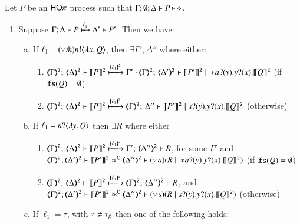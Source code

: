 	Let $P$ be an  $\mathsf{HO}\pi$ process such that  $\Gamma; \emptyset; \Delta \vdash P \triangleright \diamond$.
	
	\begin{enumerate}[1.]
		\item Suppose $\Gamma; \Delta \vdash P \xmapsto{\ell_1} \Delta' \vdash P'$.
		Then we have:
		\begin{enumerate}[a)]
			\item
				If  $\ell_1 = (\nu\, \tilde{m})n ! \langle \lambda x.\,Q \rangle$,
				then $\exists \Gamma', \Delta''$ where either:
				\begin{enumerate}[-]
					\item 
						$\tmap{\Gamma}{2};\, \tmap{\Delta}{2} \proves  \pmap{P}{2} 
						\hby{\mapa{\ell_1}{2}}
						\Gamma' \cdot \tmap{\Gamma}{2};\, \tmap{\Delta'}{2} \proves \pmap{P'}{2} \Par \repl{} \binp{a}{y} \binp{y}{x} \pmap{Q}{2}$ ({if $\mathtt{fs}(Q) = \emptyset$})
					\item 
						$\tmap{\Gamma}{2};\, \tmap{\Delta}{2} \proves \pmap{P}{2} 
						\hby{\mapa{\ell_1}{2}}
						\tmap{\Gamma}{2};\, \Delta'' \proves \pmap{P'}{2} \Par \binp{s}{y} \binp{y}{x} \pmap{Q}{2}$
						(otherwise)
				\end{enumerate}

			\item
				If   
				$\ell_1 = n ? \langle \lambda y.\,Q \rangle$
				then $\exists R$ where
				either
				\begin{enumerate}[-]
					\item 
						$\tmap{\Gamma}{2};\, \tmap{\Delta}{2} \proves \pmap{P}{2} 
						\hby{\mapa{\ell_1}{2}}
						\Gamma';\, \tmap{\Delta''}{2} \proves  R$, for some $ \Gamma'$
						and \\ 
						$\horel{\tmap{\Gamma}{2}}{\tmap{\Delta'}{2}}{\pmap{P'}{2}}{\fwb}{\tmap{\Delta''}{2}}{\newsp{a}{R \Par \repl{} \binp{a}{y} \binp{y}{x} \pmap{Q}{2}}}$ ({if $\mathtt{fs}(Q) = \emptyset$})
					\item 
						$\tmap{\Gamma}{2};\, \tmap{\Delta}{2} \proves \pmap{P}{2}
						\hby{\mapa{\ell_1}{2}}
						\tmap{\Gamma}{2};\, \tmap{\Delta''}{2} \proves R$, 
						and \\ 
						$\horel{\tmap{\Gamma}{2}}{\tmap{\Delta'}{2}}{\pmap{P'}{2}}{\fwb}{\tmap{\Delta''}{2}}{\newsp{s}{R \Par \binp{s}{y} \binp{y}{x} \pmap{Q}{2}}}$  		(otherwise)
				\end{enumerate}

			\item	If
				$\ell_1 = \tau$, with $\tau \neq \tau_{\beta}$ then one of the following holds:


\end{enumerate}
\end{enumerate}
